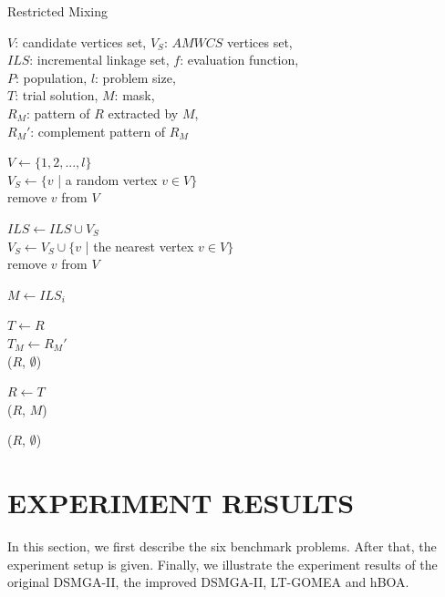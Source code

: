 \documentclass{sig-alternate-05-2015}
\begin{document}
\begin{algorithm}
\caption{Restricted Mixing}\label{algo_disjdecomp}

$V$: candidate vertices set, $V_S$: $AMWCS$ vertices set,  \\
$ILS$: incremental linkage set, $f$: evaluation function, \\
$P$: population, $l$: problem size, \\
$T$: trial solution, $M$: mask, \\
${R_M}$: pattern of $R$ extracted by $M$, \\
${R_M}'$: complement pattern of ${R_M}$


\BlankLine
$V \leftarrow \{ 1, 2, ..., l \}$ \\
$V_S \leftarrow \{v$ | a random vertex $v \in V \}$ \\
remove $v$ from $V$ \\

 {

    $ILS \leftarrow ILS \cup V_{S}$ \\
    $V_S \leftarrow V_S \cup \{v$ | the nearest vertex $v \in V \}$ \\
    remove $v$ from $V$ \\
}

\BlankLine
{} {

    $M \leftarrow ILS_i$ \\

     {

        $T \leftarrow R$ \\
        $T_M \leftarrow {R_M}'$ \\

         {
            \Return ($R$, $\emptyset$) 
        }

         {
            $R \leftarrow T$ \\
            \Return ($R$, $M$)
        }
    }
}
\Return ($R$, $\emptyset$) 
\end{algorithm}




\section{EXPERIMENT RESULTS}
In this section, we first describe the six benchmark problems. After that, the experiment setup is given. Finally, we illustrate the experiment results of the original DSMGA-II, the improved DSMGA-II, LT-GOMEA and hBOA. 
\end{document}
